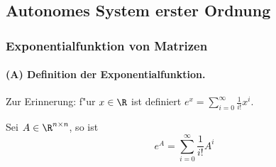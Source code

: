 \begin{auf}\chc\label{block2A2}

\end{auf}

\begin{auf}\chb\label{block2A3}

\end{auf}

\subsection{Autonomes System erster Ordnung}
\subsubsection{Exponentialfunktion von Matrizen}
\paragraph{(A) Definition der Exponentialfunktion.} Zur Erinnerung: f"ur $x\in\R$ 
ist definiert $e^x = \sum_{i=0}^\infty \frac 1 {i!} x^i.$

\begin{sdefi} Sei $A\in \R^{n\times n}$, so ist 
$$ e^{A} = \sum_{i=0}^\infty \frac 1 {i!} A^i$$
\end{sdefi}

